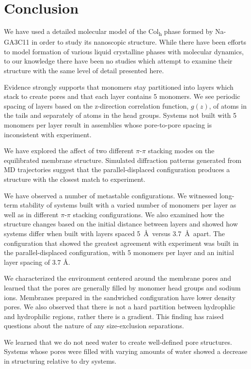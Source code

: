 \documentclass[journal=jpcbfk,manusciprt=article]{achemso}
\begin{document}
  \section{Conclusion}
  
  We have used a detailed molecular model of the Col\textsubscript{h} phase
  formed by Na-GA3C11 in order to study its nanoscopic structure. While there
  have been efforts to model formation of various liquid crystalline phases with
  molecular dynamics, to our knowledge there have been no studies which attempt
  to examine their structure with the same level of detail presented here.

  Evidence strongly supports that monomers stay partitioned into layers which
  stack to create pores and that each layer contains 5 monomers. We see periodic
  spacing of layers based on the z-direction correlation function, $g(z)$, of
  atoms in the tails and separately of atoms in the head groups. Systems not
  built with 5 monomers per layer result in assemblies whose pore-to-pore spacing
  is inconsistent with experiment. 

  We have explored the affect of two different $\pi$-$\pi$ stacking modes on
  the equilibrated membrane structure. Simulated diffraction patterns generated
  from MD trajectories suggest that the parallel-displaced configuration produces
  a structure with the closest match to experiment.

  We have observed a number of metastable configurations. We witnessed
  long-term stability of systems built with a varied number of monomers per layer
  as well as in different $\pi$-$\pi$ stacking configurations. We also examined
  how the structure changes based on the initial distance between layers and
  showed how systems differ when built with layers spaced 5~\AA~versus
  3.7~\AA~apart. The configuration that showed the greatest agreement with
  experiment was built in the parallel-displaced configuration, with 5 monomers
  per layer and an initial layer spacing of 3.7 \AA.  

  We characterized the environment centered around the membrane pores and
  learned that the pores are generally filled by monomer head groups and sodium
  ions. Membranes prepared in the sandwiched configuration have lower density 
  pores. We also observed that there is not a hard partition between hydrophlic
  and hydrophilic regions, rather there is a gradient.  This finding has raised
  questions about the nature of any size-exclusion separations.  

  We learned that we do not need water to create well-defined pore structures.
  Systems whose pores were filled with varying amounts of water showed a decrease
  in structuring relative to dry systems. 
\end{document}
